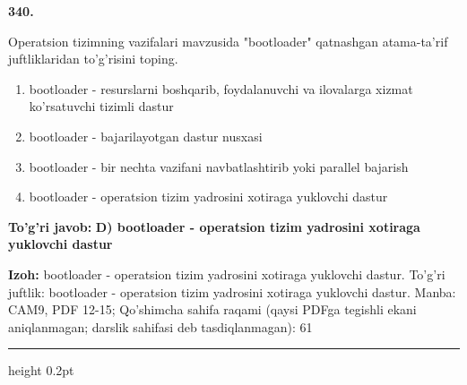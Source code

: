 \documentclass[10pt,a4paper]{article}
\begin{document}
{\bfseries\sffamily\color{ink} 340.}
\par
Operatsion tizimning vazifalari mavzusida "bootloader" qatnashgan atama-ta'rif juftliklaridan to'g'risini toping.
\begin{enumerate}[label=\Alph*),leftmargin=9mm]
\item bootloader - resurslarni boshqarib, foydalanuvchi va ilovalarga xizmat ko'rsatuvchi tizimli dastur
\item bootloader - bajarilayotgan dastur nusxasi
\item bootloader - bir nechta vazifani navbatlashtirib yoki parallel bajarish
\item bootloader - operatsion tizim yadrosini xotiraga yuklovchi dastur
\end{enumerate}
\begin{tcolorbox}[enhanced,breakable,colback=teal!4,colframe=teal!60!black,boxrule=0.45pt,arc=1.2mm,left=2.7mm,right=2.7mm,top=1.8mm,bottom=1.8mm,before skip=2mm,after skip=2mm]
{\bfseries\sffamily\color{teal}To'g'ri javob:} \textbf{D) bootloader - operatsion tizim yadrosini xotiraga yuklovchi dastur}
\par\smallskip
{\bfseries Izoh:} bootloader - operatsion tizim yadrosini xotiraga yuklovchi dastur. To'g'ri juftlik: bootloader - operatsion tizim yadrosini xotiraga yuklovchi dastur. Manba: CAM9, PDF 12-15; Qo'shimcha sahifa raqami (qaysi PDFga tegishli ekani aniqlanmagan; darslik sahifasi deb tasdiqlanmagan): 61
\end{tcolorbox}
\vspace{2mm}\hrule height 0.2pt\vspace{3mm}
\end{document}

